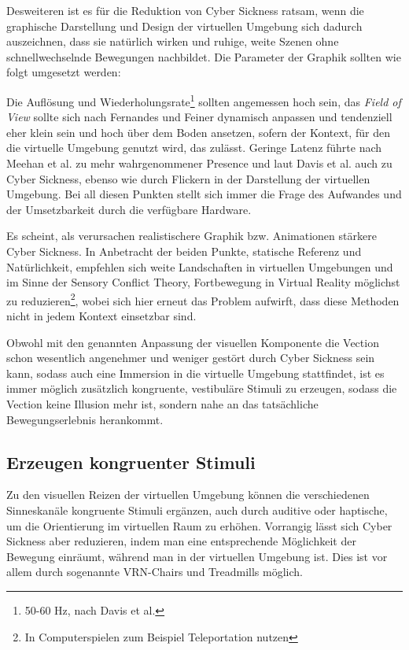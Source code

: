 Desweiteren ist es f\"ur die Reduktion von Cyber Sickness ratsam, wenn die graphische Darstellung und Design der virtuellen Umgebung sich dadurch auszeichnen, dass sie nat\"urlich wirken und ruhige, weite Szenen ohne schnellwechselnde Bewegungen nachbildet. Die Parameter der Graphik sollten wie folgt umgesetzt werden:

Die Aufl\"osung und Wiederholungsrate\footnote{50-60 Hz, nach Davis et al.\cite{Davis:2014:Factors}} sollten angemessen hoch sein\cite{kirollos:2019:refresh}, das \textit{Field of View} sollte sich nach Fernandes und Feiner\cite{Fenandes:2016:FOV} dynamisch anpassen und tendenziell eher klein sein und hoch \"uber dem Boden ansetzen, sofern der Kontext, f\"ur den die virtuelle Umgebung genutzt wird, das zul\"asst. Geringe Latenz f\"uhrte nach Meehan et al.\cite{Meehan:2003:latency} zu mehr wahrgenommener Presence und laut Davis et al.\cite{Davis:2014:Factors} auch zu Cyber Sickness, ebenso wie durch Flickern in der Darstellung der virtuellen Umgebung.
Bei all diesen Punkten stellt sich immer die Frage des Aufwandes und der Umsetzbarkeit durch die verf\"ugbare Hardware.

Es scheint, als verursachen realistischere Graphik bzw. Animationen st\"arkere Cyber Sickness\cite{Pouke:2018:Realism}.
In Anbetracht der beiden Punkte, statische Referenz und Nat\"urlichkeit, empfehlen sich weite Landschaften in virtuellen Umgebungen und im Sinne der Sensory Conflict Theory, Fortbewegung in Virtual Reality m\"oglichst zu reduzieren\footnote{In Computerspielen zum Beispiel Teleportation nutzen}, wobei sich hier erneut das Problem aufwirft, dass diese Methoden nicht in jedem Kontext einsetzbar sind.

Obwohl mit den genannten Anpassung der visuellen Komponente die Vection schon wesentlich angenehmer und weniger gest\"ort durch Cyber Sickness sein kann, sodass auch eine Immersion in die virtuelle Umgebung stattfindet, ist es immer m\"oglich zus\"atzlich kongruente, vestibul\"are Stimuli zu erzeugen, sodass die Vection keine Illusion mehr ist, sondern nahe an das tats\"achliche Bewegungserlebnis herankommt.


\subsection{Erzeugen kongruenter Stimuli}\label{Vestibular}

Zu den visuellen Reizen der virtuellen Umgebung k\"onnen die verschiedenen Sinneskan\"ale kongruente Stimuli erg\"anzen, auch durch auditive oder haptische, um die Orientierung im virtuellen Raum zu erh\"ohen. Vorrangig l\"asst sich Cyber Sickness aber reduzieren, indem man eine entsprechende M\"oglichkeit der Bewegung einr\"aumt, w\"ahrend man in der virtuellen Umgebung ist. Dies ist vor allem durch sogenannte VRN-Chairs und Treadmills m\"oglich.

